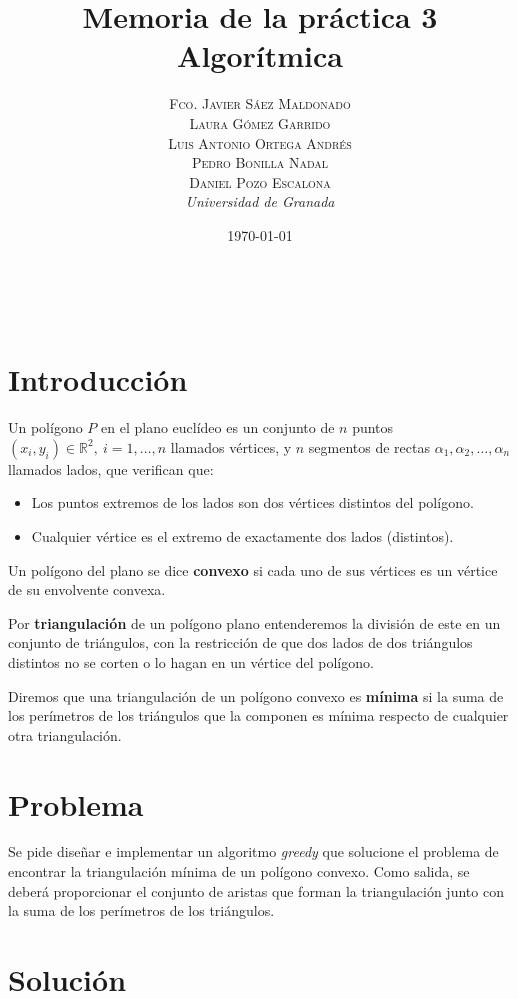 \documentclass[a4paper, 11pt]{article}
\title{\textbf{Memoria de la práctica 3}\\ %
Algorítmica} %
\author{\textsc{Fco. Javier Sáez Maldonado}\\ %
\textsc{Laura Gómez Garrido}\\
\textsc{Luis Antonio Ortega Andrés}\\
\textsc{Pedro Bonilla Nadal}\\
\textsc{Daniel Pozo Escalona}\vspace{2cm}
\\{\textit{Universidad de Granada}}} %
\date{\today} %
\makeatletter
\renewcommand{\maketitle}{
  \begin{flushright} %
  
  {\LARGE\@title} %
  
  \vspace{50pt} %
  
  {\large\@author} %
  \\\@date %
  \vspace{40pt} %
  \end{flushright}
}
\makeatother
\begin{document}
\maketitle %


{\parskip=2pt
  \tableofcontents
}
\pagebreak



\section{Introducción}

Un polígono $P$ en el plano euclídeo es un conjunto de $n$ puntos $(x_i, y_i) \in \mathbb{R}^2,\ i=1,\dots,n$ llamados vértices, y $n$ segmentos de rectas ${\alpha_1 , \alpha_2 ,\dots, \alpha_n }$ llamados lados, que verifican que:

\begin{itemize}
	\item Los puntos extremos de los lados son dos vértices distintos del polígono. 
	\item Cualquier vértice es el extremo de exactamente dos lados (distintos).
\end{itemize}

Un polígono del plano se dice \textbf{convexo} si cada uno de sus vértices es un vértice de su envolvente convexa.

 Por \textbf{triangulación} de un polígono plano entenderemos la división de este en un conjunto de triángulos, con la restricción de que dos lados de dos triángulos distintos no se corten o lo hagan en un vértice del polígono.

Diremos que una triangulación de un polígono convexo es \textbf{mínima} si la suma de los perímetros de los triángulos que la componen es mínima respecto de cualquier otra triangulación.

\section{Problema}

Se pide diseñar e implementar un algoritmo \textit{greedy} que solucione el problema de encontrar la triangulación mínima de un polígono convexo. Como salida, se deberá proporcionar el conjunto de aristas que forman la triangulación junto con la suma de los perímetros de los triángulos.

\section{Solución}
\end{document}
